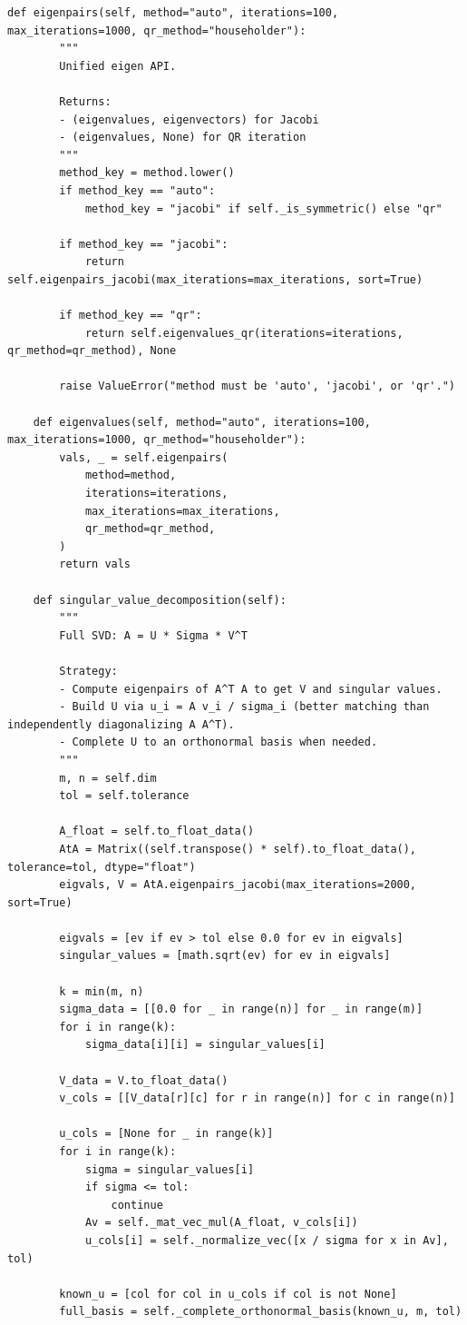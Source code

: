 \documentclass[UTF8,zihao=-4]{ctexart}
\begin{document}
\begin{lstlisting}[style=pycodestyle,caption={matlibrary.py 完整源码}]
	def eigenpairs(self, method="auto", iterations=100, max_iterations=1000, qr_method="householder"):
		"""
		Unified eigen API.

		Returns:
		- (eigenvalues, eigenvectors) for Jacobi
		- (eigenvalues, None) for QR iteration
		"""
		method_key = method.lower()
		if method_key == "auto":
			method_key = "jacobi" if self._is_symmetric() else "qr"

		if method_key == "jacobi":
			return self.eigenpairs_jacobi(max_iterations=max_iterations, sort=True)

		if method_key == "qr":
			return self.eigenvalues_qr(iterations=iterations, qr_method=qr_method), None

		raise ValueError("method must be 'auto', 'jacobi', or 'qr'.")

	def eigenvalues(self, method="auto", iterations=100, max_iterations=1000, qr_method="householder"):
		vals, _ = self.eigenpairs(
			method=method,
			iterations=iterations,
			max_iterations=max_iterations,
			qr_method=qr_method,
		)
		return vals

	def singular_value_decomposition(self):
		"""
		Full SVD: A = U * Sigma * V^T

		Strategy:
		- Compute eigenpairs of A^T A to get V and singular values.
		- Build U via u_i = A v_i / sigma_i (better matching than independently diagonalizing A A^T).
		- Complete U to an orthonormal basis when needed.
		"""
		m, n = self.dim
		tol = self.tolerance

		A_float = self.to_float_data()
		AtA = Matrix((self.transpose() * self).to_float_data(), tolerance=tol, dtype="float")
		eigvals, V = AtA.eigenpairs_jacobi(max_iterations=2000, sort=True)

		eigvals = [ev if ev > tol else 0.0 for ev in eigvals]
		singular_values = [math.sqrt(ev) for ev in eigvals]

		k = min(m, n)
		sigma_data = [[0.0 for _ in range(n)] for _ in range(m)]
		for i in range(k):
			sigma_data[i][i] = singular_values[i]

		V_data = V.to_float_data()
		v_cols = [[V_data[r][c] for r in range(n)] for c in range(n)]

		u_cols = [None for _ in range(k)]
		for i in range(k):
			sigma = singular_values[i]
			if sigma <= tol:
				continue
			Av = self._mat_vec_mul(A_float, v_cols[i])
			u_cols[i] = self._normalize_vec([x / sigma for x in Av], tol)

		known_u = [col for col in u_cols if col is not None]
		full_basis = self._complete_orthonormal_basis(known_u, m, tol)


\end{lstlisting}
\end{document}
